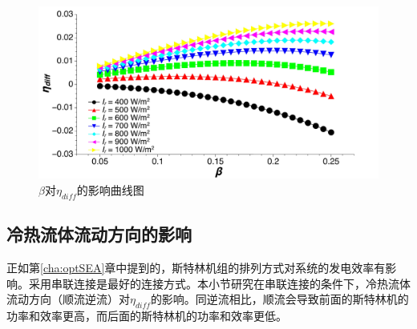 \noindent \begin{figure}[H]
\begin{center}
	\includegraphics[width = 0.8\columnwidth, angle = 0]{fig/beta-eta_diff}
	\caption{$\beta$对$\eta_{diff}$的影响曲线图}
	\label{fig:beta-eta_diff}
\end{center}
\end{figure}

\subsection{冷热流体流动方向的影响}

正如第\ref{cha:optSEA}章中提到的，斯特林机组的排列方式对系统的发电效率有影响。采用串联连接是最好的连接方式。本小节研究在串联连接的条件下，冷热流体流动方向（顺流逆流）对$\eta_{diff}$的影响。同逆流相比，顺流会导致前面的斯特林机的功率和效率更高，而后面的斯特林机的功率和效率更低。


